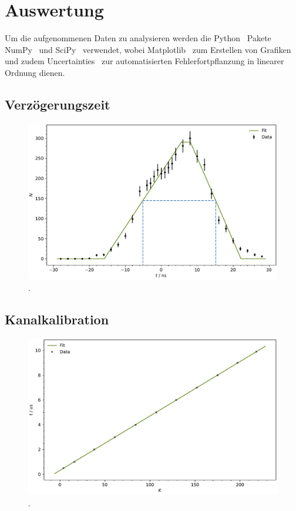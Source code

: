 \newpage
\section{Auswertung}

Um die aufgenommenen Daten zu analysieren werden die Python~\cite{python} Pakete NumPy~\cite{numpy} und SciPy~\cite{scipy} verwendet,
wobei Matplotlib~\cite{matplotlib} zum Erstellen von Grafiken und zudem Uncertainties~\cite{uncertainties} zur automatisierten
Fehlerfortpflanzung in linearer Ordnung dienen.



\subsection{Verzögerungszeit}

\begin{figure}[H]
	\centering
	\includegraphics[width=\textwidth]{build/delay.pdf}
	\caption{.}
	\label{fig:delay}
\end{figure}



\subsection{Kanalkalibration}

\begin{figure}[H]
	\centering
	\includegraphics[width=\textwidth]{build/calibration.pdf}
	\caption{.}
	\label{fig:calibration}
\end{figure}



